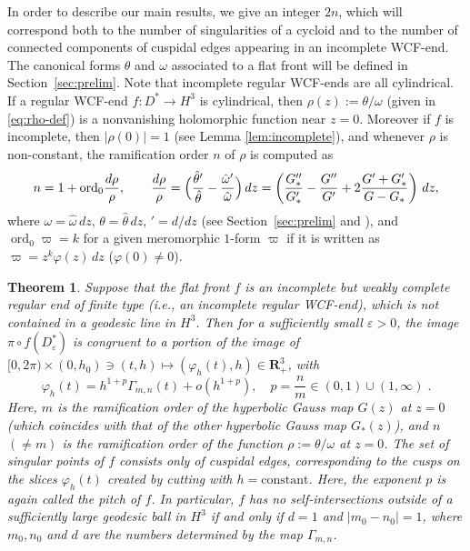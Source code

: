 \documentclass[a4paper]{amsart}
\theoremstyle{plain}
\newtheorem{introtheorem}{Theorem}
\theoremstyle{remark}
\numberwithin{equation}{section}
\begin{document}
In order to describe our main results, 
we give an integer $2n$,  
which will correspond both to the number of singularities of a cycloid
and to the number of connected components of cuspidal edges appearing in
an incomplete WCF-end.
The canonical forms $\theta$ and $\omega$ associated to a flat front
will be defined in Section~\ref{sec:prelim}.
Note that incomplete regular WCF-ends are all cylindrical.
If a regular WCF-end 
$f:D^*\to H^3$ is cylindrical, then 
$\rho(z):=\theta/\omega$ (given in \eqref{eq:rho-def}) is a
nonvanishing  
holomorphic function near $z=0$.
Moreover if $f$ is incomplete, then  $|\rho(0)|=1$ 
(see Lemma \ref{lem:incomplete}), and 
whenever $\rho$ is non-constant, 
the ramification order $n$ of $\rho$ is computed as 
\begin{equation}
 \label{eq:formula-drhorho}
  n = 1+ {\operatorname{ord}}_0\frac{d\rho}{\rho}, \qquad
        \frac{d\rho}{\rho}=
           \Bigl(\frac{\hat\theta'}{\hat\theta}-
                 \frac{\hat\omega'}{\hat\omega}
           \Bigr)\,dz
	   =  
           \left(\frac{G''_*}{G'_*}-\frac{G''}{G'}
	        +2\frac{G'+G'_*}{G-G_*}\right)\,dz,
\end{equation}
where $\omega=\hat\omega\,dz$, $\theta=\hat\theta\,dz$,
$'=d/dz$
(see Section~\ref{sec:prelim} and \cite[(3-15)]{KRSUY}),
and  ${\operatorname{ord}}_0\varpi=k$ for a given meromorphic $1$-form $\varpi$ if it is
written as  $\varpi=z^k \varphi(z)\,dz$ ($\varphi(0)\neq 0$).
\begin{introtheorem}\label{thm:incomplete}
 Suppose that the flat front $f$ is an incomplete
 but weakly complete regular end of finite type 
 {\rm (}i.e., an incomplete regular WCF-end{\rm)},
 which is not contained in a geodesic line in $H^3$.
 Then for a sufficiently small $\varepsilon>0$, 
 the image $\pi \circ f(D^*_\varepsilon)$
 is congruent to a portion of the image of 
 $[0,2\pi) \times (0,h_0) \ni (t,h)\mapsto (\varphi_h(t),h)\in {\boldsymbol{R}}_+^3$,
 with
 \begin{equation}\label{eq:asymp-incomplete}
    \varphi_h(t)=
             h^{1+p}{\varGamma}_{m,n}(t)+o(h^{1+p}),
	     \quad p=\frac{n}{m}\in (0,1)\cup (1,\infty) \; .
 \end{equation}
 Here, $m$ is the ramification order of the hyperbolic Gauss map
 $G(z)$  at $z=0$ 
 {\rm (}which coincides with that of the other hyperbolic Gauss map
 $G_*(z)${\rm )},  and $n$ $(\neq m)$ 
 is the ramification order of the function
 $\rho:=\theta/\omega$ at $z=0$.
 The set of singular points of $f$ consists 
 only of cuspidal edges, corresponding to the cusps
 on the slices $\varphi_h(t)$ created by cutting with 
 $h=\mbox{constant}$.
 Here, the exponent $p$ is again called the {\em pitch\/} of $f$.
 In particular, $f$ has no self-intersections outside of a sufficiently
 large geodesic ball in $H^3$
 if and only if $d=1$ and $|m_0-n_0|=1$, where $m_0,n_0$ and $d$
 are the numbers determined by the map ${\varGamma}_{m,n}$.
\end{introtheorem}
\end{document}
